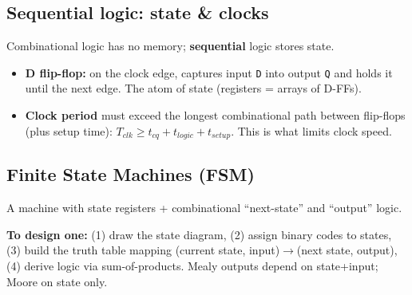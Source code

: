 \documentclass[10pt]{article}
\newcommand{\code}[1]{\texttt{\small #1}}
\begin{document}
\subsection{Sequential logic: state \& clocks}
Combinational logic has no memory; \textbf{sequential} logic stores state.
\begin{itemize}
\item \textbf{D flip-flop:} on the clock edge, captures input \code{D} into output \code{Q} and
holds it until the next edge. The atom of state (registers = arrays of D-FFs).
\item \textbf{Clock period} must exceed the longest combinational path between flip-flops
(plus setup time): $T_{clk} \ge t_{cq}+t_{logic}+t_{setup}$. This is what limits clock speed.
\end{itemize}

\subsection{Finite State Machines (FSM)}
A machine with state registers + combinational ``next-state'' and ``output'' logic.
\begin{center}
\end{center}
\textbf{To design one:} (1) draw the state diagram, (2) assign binary codes to states,
(3) build the truth table mapping (current state, input)$\to$(next state, output),
(4) derive logic via sum-of-products. Mealy outputs depend on state+input; Moore on state only.

\end{document}
